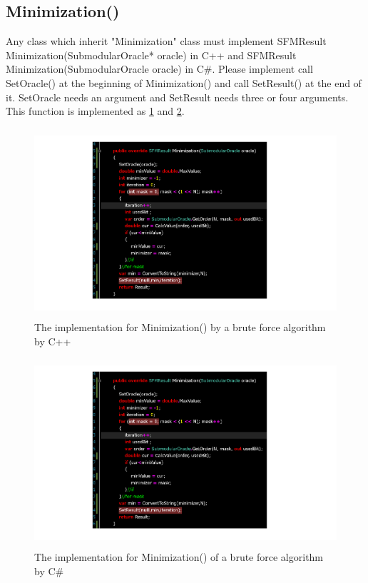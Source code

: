 \documentclass{article}
\begin{document}
\subsection{Minimization()}
Any class which inherit "Minimization" class must implement
SFMResult Minimization(SubmodularOracle* oracle) in C++
and SFMResult Minimization(SubmodularOracle oracle) in C\#.
Please implement call SetOracle() at the beginning of Minimization() and
call SetResult() at the end of it.
SetOracle needs an argument and SetResult needs three or four arguments.
This function is implemented as \ref{C++Min} and \ref{CSMin}.

\begin{figure}[h!]\label{C++Min}
{
\fontsize{10pt}{12pt}\selectfont
\centering
\includegraphics[height=7.0cm]{picture/C++Minimization.png}
\caption{The implementation for Minimization() by a brute force algorithm by C++}
}
\end{figure}

\begin{figure}[h!]\label{CSMin}
{
\fontsize{10pt}{12pt}\selectfont
\centering
\includegraphics[height=7.0cm]{picture/CSMinimization.png}
\caption{The implementation for Minimization() of a brute force algorithm by C\#}
}
\end{figure}










\end{document}
